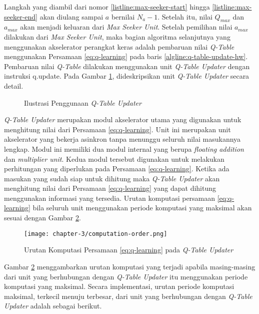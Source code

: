 Langkah yang diambil dari nomor \ref{listline:max-seeker-start} hingga \ref{listline:max-seeker-end} akan diulang sampai $a$ bernilai $N_a - 1$. Setelah itu, nilai $Q_{max}$ dan $a_{max}$ akan menjadi keluaran dari \textit{Max Seeker Unit}. Setelah pemilihan nilai $a_{max}$ dilakukan dari \textit{Max Seeker Unit}, maka bagian algoritma selanjutnya yang menggunakan akselerator perangkat keras adalah pembaruan nilai \textit{Q-Table} menggunakan Persamaan \ref{eq:q-learning} pada baris \ref{algline:q-table-update-hw}. Pembaruan nilai \textit{Q-Table} dilakukan menggunakan unit \textit{Q-Table Updater} dengan instruksi q.update. Pada Gambar \ref{fig:q-table-updater}, dideskripsikan unit \textit{Q-Table Updater} secara detail.

\begin{figure}[H]
	\centering
	\caption{Ilustrasi Penggunaan \textit{Q-Table Updater}}
	\label{fig:q-table-updater}
\end{figure}

\textit{Q-Table Updater} merupakan modul akselerator utama yang digunakan untuk menghitung nilai dari Persamaan \ref{eq:q-learning}. Unit ini merupakan unit akselerator yang bekerja asinkron tanpa menunggu seluruh nilai masukannya lengkap. Modul ini memiliki dua modul internal yang berupa \textit{floating addition} dan \textit{multiplier unit}. Kedua modul tersebut digunakan untuk melakukan perhitungan yang diperlukan pada Persamaan \ref{eq:q-learning}. Ketika ada masukan yang sudah siap untuk dihitung maka \textit{Q-Table Updater} akan menghitung nilai dari Persamaan \ref{eq:q-learning} yang dapat dihitung menggunakan informasi yang tersedia. Urutan komputasi persamaan \ref{eq:q-learning} bila seluruh unit menggunakan periode komputasi yang maksimal akan sesuai dengan Gambar \ref{fig:computation-order}.

\begin{figure}[H]
	\centering
	\texttt{[image: chapter-3/computation-order.png]}
	\caption{Urutan Komputasi Persamaan \ref{eq:q-learning} pada \textit{Q-Table Updater}}
	\label{fig:computation-order}
\end{figure}

Gambar \ref{fig:computation-order} menggambarkan urutan komputasi yang terjadi apabila masing-masing dari unit yang berhubungan dengan \textit{Q-Table Updater} itu menggunakan periode komputasi yang maksimal. Secara implementasi, urutan periode komputasi maksimal, terkecil menuju terbesar, dari unit yang berhubungan dengan \textit{Q-Table Updater} adalah sebagai berikut.

